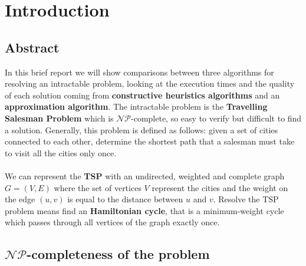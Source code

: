 \section{Introduction}


\subsection{Abstract}
In this brief report we will show comparisons between three algorithms for resolving an intractable problem, looking at the execution times and the quality of each solution coming from \textbf{constructive heuristics algorithms} and an \textbf{approximation algorithm}.
The intractable problem is the \textbf{Travelling Salesman Problem} which is $\mathcal{NP}$-complete, so easy to verify but difficult to find a solution. Generally, this problem is defined as follows: given a set of cities connected to each other, determine the shortest path that a salesman must take to visit all the cities only once.\\
\\
\noindent
We can represent the \textbf{TSP} with an undirected, weighted and complete graph $G = (V,E)$ where the set of vertices $V$ represent the cities and the weight on the edge $(u,v)$ is equal to the distance between $u$ and $v$. Resolve the TSP problem means find an \textbf{Hamiltonian cycle}, that is a minimum-weight cycle which passes through all vertices of the graph exactly once.

\subsection{$\mathcal{NP}$-completeness of the problem}

